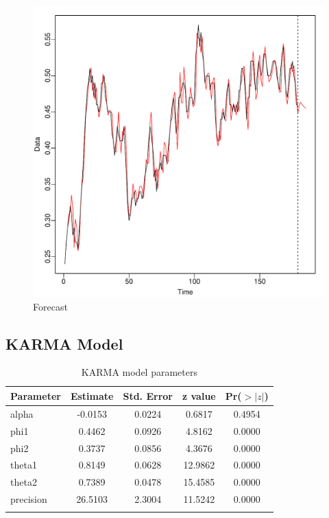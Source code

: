 \documentclass[12pt,a4paper,twoside]{article}
\begin{document}
\newpage
\begin{figure}[!ht]
    \centering
    \includegraphics[width=\textwidth]{img/BARMA-forecast.pdf}
    \caption{Forecast}
    \label{fig:BARMAForecast}
\end{figure}
\newpage
\subsection{KARMA Model}
\label{ssec:KARMA}
\begin{longtable}{lcccc}
    \caption{KARMA model parameters}\\
    \hline
    \textbf{Parameter} & \textbf{Estimate} & \textbf{Std. Error} & \textbf{z value} & \textbf{Pr($>|z|$)} \\
    \hline
    alpha              & -0.0153           & 0.0224              & 0.6817           & 0.4954              \\
    phi1               & 0.4462            & 0.0926              & 4.8162           & 0.0000              \\
    phi2               & 0.3737            & 0.0856              & 4.3676           & 0.0000              \\
    theta1             & 0.8149            & 0.0628              & 12.9862          & 0.0000              \\
    theta2             & 0.7389            & 0.0478              & 15.4585          & 0.0000              \\
    precision          & 26.5103           & 2.3004              & 11.5242          & 0.0000              \\
    \hline
    \label{tab:KARMAparamstab}
\end{longtable}
\end{document}

